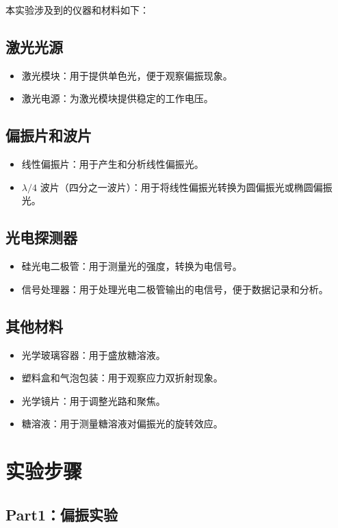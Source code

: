\documentclass{ctexart}
\begin{document}
本实验涉及到的仪器和材料如下：

\subsection{激光光源}
\begin{itemize}
    \item 激光模块：用于提供单色光，便于观察偏振现象。
    \item 激光电源：为激光模块提供稳定的工作电压。
\end{itemize}

\subsection{偏振片和波片}
\begin{itemize}
    \item 线性偏振片：用于产生和分析线性偏振光。
    \item $\lambda/4$ 波片（四分之一波片）：用于将线性偏振光转换为圆偏振光或椭圆偏振光。
\end{itemize}

\subsection{光电探测器}
\begin{itemize}
    \item 硅光电二极管：用于测量光的强度，转换为电信号。
    \item 信号处理器：用于处理光电二极管输出的电信号，便于数据记录和分析。
\end{itemize}

\subsection{其他材料}
\begin{itemize}
    \item 光学玻璃容器：用于盛放糖溶液。
    \item 塑料盒和气泡包装：用于观察应力双折射现象。
    \item 光学镜片：用于调整光路和聚焦。
    \item 糖溶液：用于测量糖溶液对偏振光的旋转效应。
\end{itemize}

\section{实验步骤}
\subsection{Part1：偏振实验}
\end{document}
